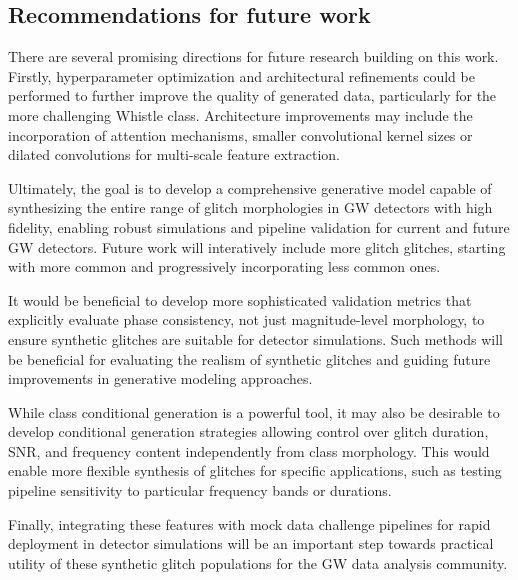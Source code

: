 \documentclass[reprint,nofootinbib,amsmath,amssymb,aps,floatfix]{revtex4-2}
\begin{document}
\subsection{Recommendations for future work}

There are several promising directions for future research building on this work. Firstly, hyperparameter optimization and architectural refinements could be performed to further improve the quality of generated data, particularly for the more challenging Whistle class.
Architecture improvements may include the incorporation of attention mechanisms, smaller convolutional kernel sizes or dilated convolutions for multi-scale feature extraction.

Ultimately, the goal is to develop a comprehensive generative model capable of synthesizing the entire range of glitch morphologies in GW detectors with high fidelity, enabling robust simulations and pipeline validation for current and future GW detectors.
Future work will interatively include more glitch glitches, starting with more common and progressively incorporating less common ones.

It would be beneficial to develop more sophisticated validation metrics that explicitly evaluate phase consistency, not just magnitude-level morphology, to ensure synthetic glitches are suitable for detector simulations.
Such methods will be beneficial for evaluating the realism of synthetic glitches and guiding future improvements in generative modeling approaches.

While class conditional generation is a powerful tool, it may also be desirable to develop conditional generation strategies allowing control over glitch duration, SNR, and frequency content independently from class morphology.
This would enable more flexible synthesis of glitches for specific applications, such as testing pipeline sensitivity to particular frequency bands or durations.

Finally, integrating these features with mock data challenge pipelines for rapid deployment in detector simulations will be an important step towards practical utility of these synthetic glitch populations for the GW data analysis community.


\end{document}
